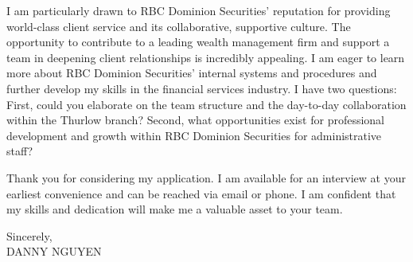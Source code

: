 \documentclass[letterpaper,11pt]{article}
\begin{document}
I am particularly drawn to RBC Dominion Securities' reputation for providing world-class client service and its collaborative, supportive culture.  The opportunity to contribute to a leading wealth management firm and support a team in deepening client relationships is incredibly appealing.  I am eager to learn more about RBC Dominion Securities’ internal systems and procedures and further develop my skills in the financial services industry. I have two questions: First, could you elaborate on the team structure and the day-to-day collaboration within the Thurlow branch? Second, what opportunities exist for professional development and growth within RBC Dominion Securities for administrative staff?

\vspace{10pt}

Thank you for considering my application. I am available for an interview at your earliest convenience and can be reached via email or phone. I am confident that my skills and dedication will make me a valuable asset to your team.

\vspace{20pt}

Sincerely, \\
\vspace{40pt}
DANNY NGUYEN
\end{document}
